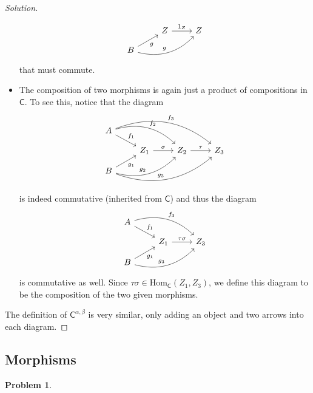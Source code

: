\documentclass{article}
\theoremstyle{definition}
\newtheorem{problem-internal}{Problem}[subsection]
\newenvironment{problem}{
	\medskip
	\begin{problem-internal}
	}{
\end{problem-internal}
}
\newenvironment{solution}{
	\begin{proof}[Solution]
		\vspace{-8px}
		\setlength{\parskip}{4px}
		\setlength{\parindent}{0px}
	}{
\end{proof}
}
\newcommand{\Hom}{\mathrm{Hom}}
\newcommand{\C}{\mathsf{C}}
\begin{document}
\begin{solution}
\begin{itemize}
\begin{equation*}
\begin{tikzcd}[row sep=small]
					& Z \arrow[r, "1_Z"]& Z \\
					B \arrow[ur, "g" swap] \arrow[urr, bend right, "g"] & &
				\end{tikzcd}
			\end{equation*}
			that must commute.
		\item The composition of two morphisms is again just a product of compositions in $\C$. To see this, notice that the diagram
			\begin{equation*}
				\begin{tikzcd}[row sep=small]
					A \arrow[dr, "f_1"] 
					  \arrow[drr, bend left,"f_2"]
					  \arrow[drrr, bend left, "f_3"] & & & \\
					& Z_1 \arrow[r, "\sigma"]& Z_2 \arrow[r, "\tau"] & Z_3 \\
					B \arrow[ur, "g_1" swap]
					  \arrow[urr, bend right, "g_2"]
					  \arrow[urrr, bend right, "g_3"] & & &
				\end{tikzcd}
			\end{equation*}
			is indeed commutative (inherited from $\C$) and thus the diagram
			\begin{equation*}
				\begin{tikzcd}[row sep=small]
					A \arrow[dr, "f_1"] \arrow[drr, bend left,"f_3"] & & \\
					& Z_1 \arrow[r, "\tau\sigma"]& Z_3 \\
					B \arrow[ur, "g_1" swap] \arrow[urr, bend right, "g_3"] & &
				\end{tikzcd}
			\end{equation*}
			is commutative as well. Since $\tau\sigma \in \Hom_\C(Z_1, Z_3)$, we define this diagram to be the composition of the two given morphisms.
	\end{itemize}
	
	The definition of $\C^{\alpha, \beta}$ is very similar, only adding an object and two arrows into each diagram.
\end{solution}

\subsection{Morphisms}

\begin{problem}
\end{problem}
\end{document}
